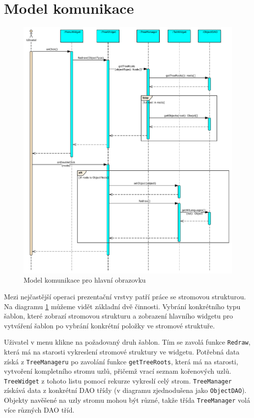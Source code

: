 \documentclass[thesis=B,czech]{resources/FITthesis}[2012/06/26]
\begin{document}
	\section{Model komunikace}
	\begin{figure}\centering
	\includegraphics[width=1\textwidth]{images/comunication_main}
	\caption[Model komunikace pro hlavní obrazovku]{Model komunikace pro hlavní obrazovku}\label{fig:comunication_main}
	\end{figure}
Mezi nejčastější operaci prezentační vrstvy patří práce se stromovou strukturou. Na diagramu \ref{fig:comunication_main} můžeme vidět základní dvě činnosti. Vybrání konkrétního typu šablon, které zobrazí stromovou strukturu a zobrazení hlavního widgetu pro vytváření šablon po vybrání konkrétní položky ve stromové struktuře.\par

Uživatel v menu klikne na požadovaný druh šablon. Tím se zavolá funkce \texttt{Redraw}, která má na starosti vykreslení stromové struktury ve widgetu. Potřebná data získá z \texttt{TreeManageru} po zavolání funkce \texttt{getTreeRoots}, která má na starosti, vytvoření kompletního stromu uzlů, přičemž vrací seznam kořenových uzlů. \texttt{TreeWidget} z tohoto listu pomocí rekurze vykreslí celý strom. \texttt{TreeManager} získává data z konkrétní DAO třídy (v diagramu zjednodušena jako \texttt{ObjectDAO}). Objekty navěšené na uzly stromu mohou být různé, takže třída \texttt{TreeManager} volá více různých DAO tříd.\par
\end{document}
